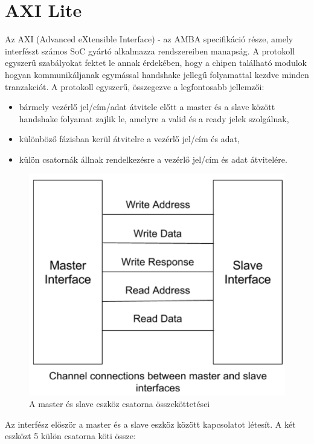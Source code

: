 \documentclass[a4paper,11pt]{article}
\begin{document}
\section{AXI Lite}
Az AXI (Advanced eXtensible Interface) - az AMBA specifikáció része, amely interfészt számos SoC gyártó alkalmazza rendszereiben manapság. A protokoll egyszerű szabályokat fektet le annak érdekében, hogy a chipen található modulok hogyan kommunikáljanak egymással handshake jellegű folyamattal kezdve minden tranzakciót. A protokoll egyszerű, összegezve a legfontosabb jellemzői:
\begin{itemize}
	\item bármely vezérlő jel/cím/adat átvitele előtt a master és a slave között handshake folyamat zajlik le, amelyre a valid és a ready jelek szolgálnak,
	\item különböző fázisban kerül átvitelre a vezérlő jel/cím és adat,
	\item külön csatornák állnak rendelkezésre a vezérlő jel/cím és adat átvitelére.
\end{itemize}
\begin{figure}[H]
	\begin{center}
	\includegraphics[scale=0.3]{axi_teo.png}
	\caption{A master és slave eszköz csatorna összeköttetései}
	\label{fig:axi_teo}
	\end{center}
\end{figure}
Az interfész először a master és a slave eszköz között kapcsolatot létesít. A két eszközt 5 külön csatorna köti össze:
\end{document}
